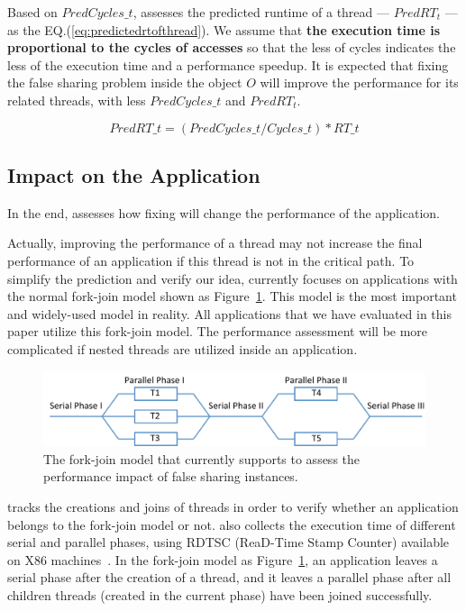Based on $PredCycles\_{t}$, \cheetah{} assesses the predicted runtime of a thread --- $PredRT_{t}$ --- as the EQ.(\ref{eq:predictedrtofthread}). We assume that {\bf the execution time is proportional to the cycles of accesses} so that the less of cycles indicates the less of the execution time and a performance speedup. It is expected that fixing the false sharing problem inside the object $O$ will improve the performance for its related threads, with less $PredCycles\_{t}$ and $PredRT_{t}$. 

\begin{equation}
\label{eq:predictedrtofthread}
 PredRT\_{t} = (PredCycles\_{t} / Cycles\_{t}) * RT\_{t} 
\end{equation} 

\subsection{Impact on the Application}
\label{sec:impactapp}

In the end, \cheetah{} assesses how fixing will change the performance of the application. 

Actually, improving the performance of a thread may not increase the final performance of an application if this thread is not in the critical path.  To simplify the prediction and verify our idea, \cheetah{} currently focuses on applications with the normal fork-join model shown as Figure~\ref{fig:forkjoinmodel}. This model is the most important and widely-used model in reality. All applications that we have evaluated in this paper utilize this fork-join model. The performance assessment will be more complicated if nested threads are utilized inside an application. 


\begin{figure}[ht!]
\begin{center}
\includegraphics[width=6in]{figure/forkjoin}
\end{center}
\caption{The fork-join model that \Cheetah{} currently supports to assess the performance impact of false sharing instances. }
\label{fig:forkjoinmodel}
\end{figure}

\cheetah{} tracks the creations and joins of threads in order to verify whether an application belongs to the fork-join model or not. \Cheetah{} also collects the execution time of different serial and parallel phases, using RDTSC (ReaD-Time Stamp Counter) available on X86 machines~\cite{rtdsc}. In the fork-join model as Figure~\ref{fig:forkjoinmodel}, an application leaves a serial phase after the creation of a thread, and it leaves a parallel phase after all children threads (created in the current phase) have been joined successfully. 


